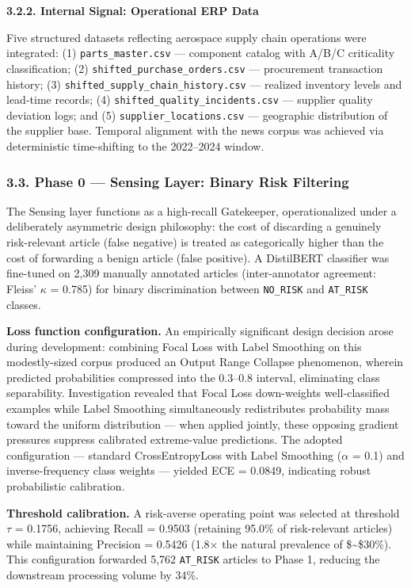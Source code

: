 \documentclass[conference]{IEEEtran}
\begin{document}
\textbf{3.2.2. Internal Signal: Operational ERP Data}

Five structured datasets reflecting aerospace supply chain operations
were integrated: (1) \texttt{parts\_master.csv} --- component catalog
with A/B/C criticality classification; (2)
\texttt{shifted\_purchase\_orders.csv} --- procurement transaction
history; (3) \texttt{shifted\_supply\_chain\_history.csv} --- realized
inventory levels and lead-time records; (4)
\texttt{shifted\_quality\_incidents.csv} --- supplier quality deviation
logs; and (5) \texttt{supplier\_locations.csv} --- geographic
distribution of the supplier base. Temporal alignment with the news
corpus was achieved via deterministic time-shifting to the 2022--2024
window.

\subsubsection{3.3. Phase 0 --- Sensing Layer: Binary Risk
Filtering}\label{phase-0-sensing-layer-binary-risk-filtering}

The Sensing layer functions as a high-recall Gatekeeper, operationalized
under a deliberately asymmetric design philosophy: the cost of
discarding a genuinely risk-relevant article (false negative) is treated
as categorically higher than the cost of forwarding a benign article
(false positive). A DistilBERT classifier was fine-tuned on 2,309
manually annotated articles (inter-annotator agreement: Fleiss'
\(\kappa\) = 0.785) for binary discrimination between \texttt{NO\_RISK}
and \texttt{AT\_RISK} classes.

\textbf{Loss function configuration.} An empirically significant design
decision arose during development: combining Focal Loss with Label
Smoothing on this modestly-sized corpus produced an Output Range
Collapse phenomenon, wherein predicted probabilities compressed into the
0.3--0.8 interval, eliminating class separability. Investigation
revealed that Focal Loss down-weights well-classified examples while
Label Smoothing simultaneously redistributes probability mass toward the
uniform distribution --- when applied jointly, these opposing gradient
pressures suppress calibrated extreme-value predictions. The adopted
configuration --- standard CrossEntropyLoss with Label Smoothing
(\(\alpha\) = 0.1) and inverse-frequency class weights --- yielded ECE =
0.0849, indicating robust probabilistic calibration.

\textbf{Threshold calibration.} A risk-averse operating point was
selected at threshold \(\tau\) = 0.1756, achieving Recall = 0.9503
(retaining 95.0\% of risk-relevant articles) while maintaining Precision
= 0.5426 (1.8\(\times\) the natural prevalence of \$\sim\$30\%). This
configuration forwarded 5,762 \texttt{AT\_RISK} articles to Phase 1,
reducing the downstream processing volume by 34\%.
\end{document}
